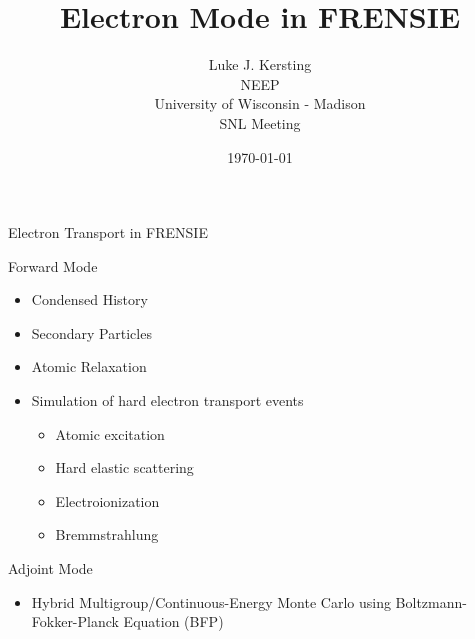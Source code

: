 \documentclass{beamer}
\author{Luke J. Kersting
    \\ NEEP
    \\ University of Wisconsin - Madison
    \\ SNL Meeting
}
\date{\today}
\title{Electron Mode in FRENSIE}
\begin{document}
\maketitle

\begin{frame}{Electron Transport in FRENSIE}

  \begin{block}{Forward Mode}
    \begin{itemize}
      \item Condensed History
      \item Secondary Particles
      \item Atomic Relaxation
      \item Simulation of hard electron transport events
      \begin{itemize}
         \item Atomic excitation
         \item Hard elastic scattering
         \item Electroionization
         \item Bremmstrahlung
      \end{itemize}
    \end{itemize}
  \end{block}
    
  \begin{block}{Adjoint Mode}
    \begin{itemize}
      \item Hybrid Multigroup/Continuous-Energy Monte Carlo using Boltzmann-Fokker-Planck Equation (BFP)
    \end{itemize}    
  \end{block}  

\end{frame}
\end{document}
